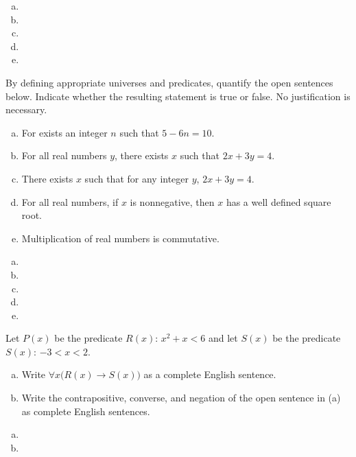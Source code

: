 \documentclass[11pt,letterpaper]{article}
\begin{document}
\sol 
\begin{enumerate}[(a)]
\item 
\item 
\item 
\item 
\item 
\end{enumerate}



\newpage



 By defining appropriate universes and predicates, quantify the open sentences below. Indicate whether the resulting statement is true or false. No justification is necessary. 
	\begin{enumerate}[(a)]
	\item For exists an integer $n$ such that $5 - 6n= 10$.
	\item For all real numbers $y$, there exists $x$ such that $2x + 3y= 4$.
	\item There exists $x$ such that for any integer $y$, $2x + 3y= 4$. 
	\item For all real numbers, if $x$ is nonnegative, then $x$ has a well defined square root. 
	\item Multiplication of real numbers is commutative. 
	\end{enumerate} \pspace

\sol 
\begin{enumerate}[(a)]
\item 
\item 
\item 
\item 
\item 
\end{enumerate}



\newpage



 Let $P(x)$ be the predicate $R(x)$: $x^2 + x < 6$ and let $S(x)$ be the predicate $S(x)$: $-3 < x < 2$.  
	\begin{enumerate}[(a)]
	\item Write $\forall x \big( R(x) \to S(x) \big)$ as a complete English sentence.
	\item Write the contrapositive, converse, and negation of the open sentence in (a) as complete English sentences. 
	\end{enumerate} \pspace

\sol 
\begin{enumerate}[(a)]
\item 
\item 
\end{enumerate}
\end{document}
